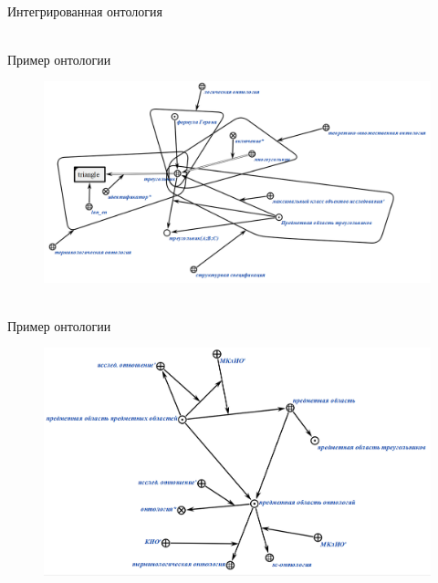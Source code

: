 \begin{frame}{\\Интегрированная онтология}
	\topline
	\justifying 
	\begin{SCn}
		
	\end{SCn}
\end{frame}

\begin{frame}{\\Пример онтологии}
	\topline
	\justifying 
	\vspace{10mm}
	\begin{figure}[H]
	\includegraphics[scale=0.31]{./figures/sd_ontologies/ontology1.png}
	\end{figure}
\end{frame}

\begin{frame}{\\Пример онтологии}
	\topline
	\justifying 
	\vspace{10mm}
	\begin{figure}[H]
		\includegraphics[scale=0.23]{./figures/sd_ontologies/ontology2.png}
	\end{figure}
\end{frame}

